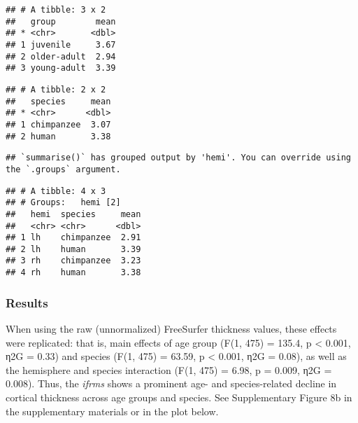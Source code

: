 \documentclass[
]{article}
\newenvironment{Shaded}{\begin{snugshade}}{\end{snugshade}}
\newcommand{\CommentTok}[1]{\textcolor[rgb]{0.56,0.35,0.01}{\textit{#1}}}
\newcommand{\DataTypeTok}[1]{\textcolor[rgb]{0.13,0.29,0.53}{#1}}
\newcommand{\KeywordTok}[1]{\textcolor[rgb]{0.13,0.29,0.53}{\textbf{#1}}}
\newcommand{\NormalTok}[1]{#1}
\newcommand{\OperatorTok}[1]{\textcolor[rgb]{0.81,0.36,0.00}{\textbf{#1}}}
\newcommand{\StringTok}[1]{\textcolor[rgb]{0.31,0.60,0.02}{#1}}
\begin{document}
\begin{verbatim}
## # A tibble: 3 x 2
##   group        mean
## * <chr>       <dbl>
## 1 juvenile     3.67
## 2 older-adult  2.94
## 3 young-adult  3.39
\end{verbatim}

\begin{Shaded}
\end{Shaded}

\begin{verbatim}
## # A tibble: 2 x 2
##   species     mean
## * <chr>      <dbl>
## 1 chimpanzee  3.07
## 2 human       3.38
\end{verbatim}

\begin{Shaded}
\end{Shaded}

\begin{verbatim}
## `summarise()` has grouped output by 'hemi'. You can override using the `.groups` argument.
\end{verbatim}

\begin{verbatim}
## # A tibble: 4 x 3
## # Groups:   hemi [2]
##   hemi  species     mean
##   <chr> <chr>      <dbl>
## 1 lh    chimpanzee  2.91
## 2 lh    human       3.39
## 3 rh    chimpanzee  3.23
## 4 rh    human       3.38
\end{verbatim}

\hypertarget{results-1}{%
\subsubsection{Results}\label{results-1}}

When using the raw (unnormalized) FreeSurfer thickness values, these
effects were replicated: that is, main effects of age group (F(1, 475) =
135.4, p \textless{} 0.001, η2G = 0.33) and species (F(1, 475) = 63.59,
p \textless{} 0.001, η2G = 0.08), as well as the hemisphere and species
interaction (F(1, 475) = 6.98, p = 0.009, η2G = 0.008). Thus, the
\emph{ifrms} shows a prominent age- and species-related decline in
cortical thickness across age groups and species. See Supplementary
Figure 8b in the supplementary materials or in the plot below.
\end{document}
